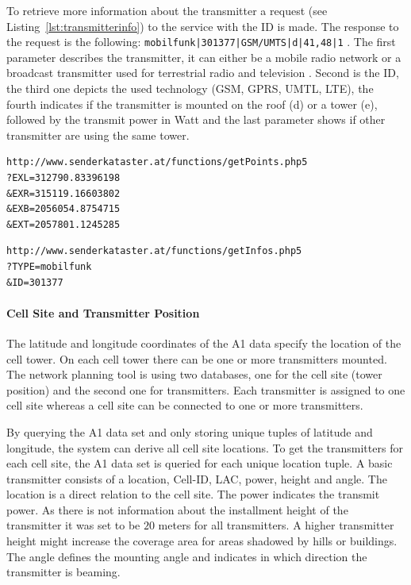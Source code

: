 To retrieve more information about the transmitter a request (see Listing~\ref{lst:transmitterinfo}) to the service with the ID is made. The response to the request is the following: \lstinline+mobilfunk|301377|GSM/UMTS|d|41,48|1+ . The first parameter describes the transmitter, it can either be a mobile radio network or a broadcast transmitter used for terrestrial radio and television . Second is the ID, the third one depicts the used technology (GSM, GPRS, UMTL, LTE), the fourth indicates if the transmitter is mounted on the roof (d) or a tower (e), followed by the transmit power in Watt and the last parameter shows if other transmitter are using the same tower.
\begin{lstlisting}[caption=Request to retrieve station within the boudning box,label=lst:senderbbox]
http://www.senderkataster.at/functions/getPoints.php5
?EXL=312790.83396198
&EXR=315119.16603802
&EXB=2056054.8754715
&EXT=2057801.1245285
\end{lstlisting}

\begin{lstlisting}[caption=Request to retrieve transmitter information,label=lst:transmitterinfo]
http://www.senderkataster.at/functions/getInfos.php5
?TYPE=mobilfunk
&ID=301377
\end{lstlisting}
\paragraph{Cell Site and Transmitter Position}
The latitude and longitude coordinates of the A1 data specify the location of the cell tower. On each cell tower there can be one or more transmitters mounted. The network planning tool is using two databases, one for the cell site (tower position) and the second one for transmitters. Each transmitter is assigned to one cell site whereas a cell site can be connected to one or more transmitters.

By querying the A1 data set and only storing unique tuples of latitude and longitude, the system can derive all cell site locations. To get the transmitters for each cell site, the A1 data set is queried for each unique location tuple. A basic transmitter consists of a location, Cell-ID, LAC, power, height and angle. The location is a direct relation to the cell site. The power indicates the transmit power. As there is not information about the installment height of the transmitter it was set to be $20$ meters for all transmitters. A higher transmitter height might increase the coverage area for areas shadowed by hills or buildings. The angle defines the mounting angle and indicates in which direction the transmitter is beaming.

